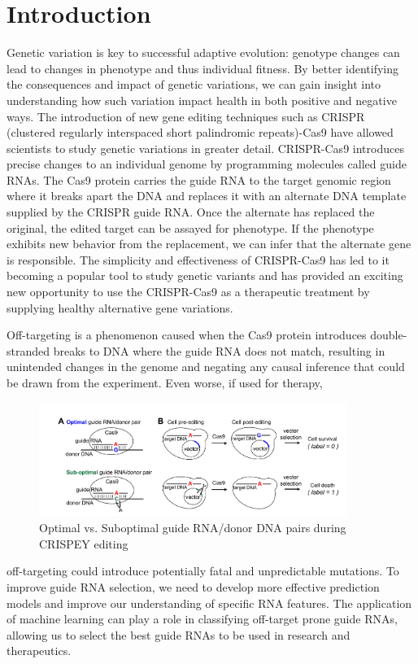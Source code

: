\documentclass[journal]{IEEEtran}
\begin{document}
\section*{Introduction}
Genetic variation is key to successful adaptive evolution: genotype changes can lead to changes in phenotype and thus individual fitness. By better identifying the consequences and impact of genetic variations, we can gain insight into understanding how such variation impact health in both positive and negative ways. The introduction of new gene editing techniques such as CRISPR  (clustered regularly interspaced short palindromic repeats)-Cas9 have allowed scientists to study genetic variations in greater detail. CRISPR-Cas9 introduces precise changes to an individual  genome by programming molecules called guide RNAs. The Cas9 protein carries the guide RNA to the target genomic region where it breaks apart the DNA and replaces it with an alternate DNA template supplied by the CRISPR guide RNA. Once the alternate has replaced the original, the edited target can be assayed for phenotype. If the phenotype exhibits new behavior from the replacement, we can infer that the alternate gene is responsible. The simplicity and effectiveness of CRISPR-Cas9 has led to it becoming a popular tool to study genetic variants and has provided an exciting new opportunity to use the CRISPR-Cas9 as a therapeutic treatment by supplying healthy alternative  gene variations.

Off-targeting is a phenomenon caused when the Cas9 protein introduces double-stranded breaks to DNA where the guide RNA does not match, resulting in unintended changes in the genome and negating any causal inference that could be drawn from the experiment. Even worse, if used for therapy, 
\begin{figure}[h]
	\includegraphics[width=10cm]{../self_cut}
	\caption{Optimal vs. Suboptimal guide RNA/donor DNA pairs during CRISPEY editing}
\end{figure}  off-targeting could introduce potentially fatal and unpredictable mutations. To improve guide RNA selection, we need to develop more effective prediction models and improve our understanding of specific RNA features. The application of machine learning can play a role in classifying off-target prone guide RNAs, allowing us to select the best guide RNAs to be used in research and therapeutics. 
\end{document}
